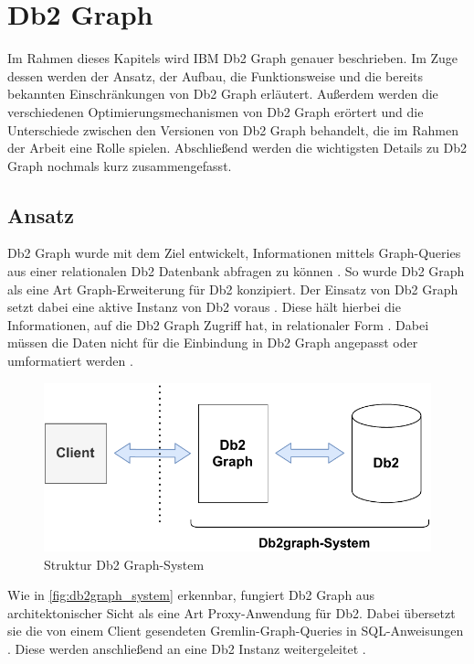 \section{Db2 Graph}
\label{chap:db2graph}

Im Rahmen dieses Kapitels wird IBM Db2 Graph genauer beschrieben. Im Zuge dessen werden der Ansatz, der Aufbau, die Funktionsweise und die bereits bekannten Einschränkungen  von Db2 Graph erläutert. Außerdem werden die verschiedenen Optimierungsmechanismen von Db2 Graph erörtert und die Unterschiede zwischen den Versionen von Db2 Graph behandelt,  die im Rahmen der Arbeit eine Rolle spielen. Abschließend werden die wichtigsten Details zu Db2 Graph nochmals kurz zusammengefasst.

\subsection{Ansatz}
\label{db2graph:ansatz}
Db2 Graph wurde mit dem Ziel entwickelt, Informationen mittels Graph-Queries aus einer relationalen Db2 Datenbank abfragen zu können \cite{vldb_tian, sigmod_tian}. So wurde Db2 Graph als eine Art Graph-Erweiterung für Db2 konzipiert. Der Einsatz von Db2 Graph setzt dabei eine aktive Instanz von Db2 voraus \cite{vldb_tian, sigmod_tian}. Diese hält hierbei die Informationen, auf die Db2 Graph Zugriff hat, in relationaler Form \cite{vldb_tian, sigmod_tian}. Dabei müssen die Daten nicht für die Einbindung in Db2 Graph angepasst oder umformatiert werden \cite{vldb_tian, sigmod_tian}.

\begin{figure}[ht]
    \centering
    \includegraphics[width=\textwidth]{images/db2graph_system.pdf}
    \vspace{0.1em}
    \caption{Struktur Db2 Graph-System}
    \label{fig:db2graph_system}
\end{figure}

Wie in \autoref{fig:db2graph_system} erkennbar, fungiert Db2 Graph aus architektonischer Sicht als eine Art Proxy-Anwendung für Db2. Dabei übersetzt sie die von einem Client gesendeten Gremlin-Graph-Queries in SQL-An\-wei\-sung\-en \cite{vldb_tian, sigmod_tian}. Diese werden anschließend an eine Db2 Instanz weitergeleitet \cite{vldb_tian, sigmod_tian}. 


